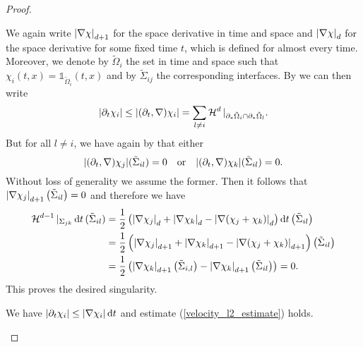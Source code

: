 \begin{proof}
\begin{description}[wide=0pt]
		We again write $ \abs{ \nabla \chi }_{ d + 1 } $ for the space 
		derivative in time and space and $ \abs{ \nabla \chi }_{ d } $ for the 
		space derivative for some fixed time $ t $, which is defined for almost 
		every time. Moreover, we denote by $ \tilde{ \Omega }_{ i } $ the set 
		in time and space such that
		$ \chi_{ i } ( t , x ) = \mathds{ 1 }_{ \tilde{ \Omega }_{ i } } ( t , 
		x ) $
		and by $ \tilde{ \Sigma }_{ i j } $ the corresponding interfaces.
		By  we can then write
		\begin{equation*}
			\abs{ \partial_{ t } \chi_{ i } }
			\leq
			\abs{ ( \partial_{ t } , \nabla ) \chi_{ i } }
			=
			\sum_{ l \neq i }
			\operatorname{\mathcal{H}}^{ d } |_{ \partial_{ \ast } \tilde{ \Omega }_{ i } \cap 
			\partial_{ \ast } \tilde{ \Omega }_{ l } }.
		\end{equation*}
		But for all $ l \neq i $, we have again by 
		 that either 
		\begin{equation*}
			\abs{ ( \partial_{ t } , \nabla ) \chi_{ j } } ( \tilde{ \Sigma }_{ 
				i l } ) = 0 
			\quad \text{or} \quad
			\abs{ ( \partial_{ t } , \nabla ) \chi_{ k } } ( \tilde{ \Sigma }_{ 
				i l } ) = 0.
		\end{equation*}
		Without loss of generality we assume the former. 
		Then it follows that $ \abs{ \nabla \chi_{ j } }_{ d + 1 } \left( 
		\tilde{ \Sigma }_{ i l } \right) = 0 $ and therefore we have
		\begin{align*}
			\operatorname{\mathcal{H}}^{ d - 1 } |_{ \Sigma_{ j k } } \dd{ t } ( \tilde{ \Sigma }_{ i 
				l } )
			& =
			\frac{ 1 }{ 2 } \left(
			\abs{ \nabla \chi_{ j } }_{ d }
			+
			\abs{ \nabla \chi_{ k } }_{ d }
			-
			\abs{ \nabla ( \chi_{ j } + \chi_{ k } ) }_{ d }
			\right)
			\dd{ t }
			\left( \tilde{ \Sigma }_{ i l }\right)
			\\
			& = 
			\frac{ 1 }{ 2 } \left(
			\abs{ \nabla \chi_{ j } }_{ d+1 }
			+
			\abs{ \nabla \chi_{ k } }_{ d +1 }
			-
			\abs{ \nabla ( \chi_{ j } + \chi_{ k } ) }_{ d+ 1 }
			\right) \left( \tilde{ \Sigma }_{ i l } \right)
			\\
			& = 
			\frac{ 1 }{ 2 } \left( 
			\abs{ \nabla \chi_{ k } }_{ d + 1 } \left( \tilde{ \Sigma } _{ i , 
			l } \right)
			-
			\abs{ \nabla \chi_{ k } }_{ d + 1 } 
			\left( \tilde{ \Sigma } _{ i l } \right)
			\right)
			= 0.		
		\end{align*}
		This proves the desired singularity.
		
		\item[Step 4:] We have 
		$ \abs{ \partial_{ t } \chi_{ i } } 
		\leq \abs{ \nabla \chi_{ i } } \dd{ t } $ and estimate 
		(\ref{velocity_l2_estimate}) holds.
		

\end{description}
\end{proof}
